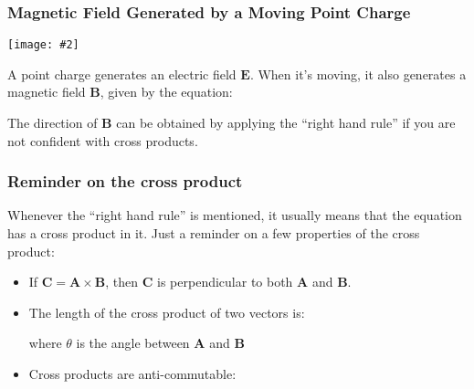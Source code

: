 \documentclass[12pt,aspectratio=169]{beamer}
\newcommand{\pic}[2]{\texttt{[image: \#2]}}
\newcommand{\mb}[1]{\mathbf{#1}}
\newcommand{\eq}[2]{\vspace{#1}{\Large\begin{displaymath}#2\end{displaymath}}}
\newcommand{\protip}[1]{
  \begin{center}
    \fbox{
      \begin{minipage}{.95\textwidth}
        {\footnotesize
          \textbf{Protip: }#1
        }
      \end{minipage}
    }
  \end{center}
}
\begin{document}
%
\begin{frame}
  \frametitle{Magnetic Field Generated by a Moving Point Charge}
  \begin{center}
    \pic{.35}{pointchargeB.png}
  \end{center}
  
  A point charge generates an electric field $\mb{E}$. When it's moving, it
  also generates a magnetic field $\mb{B}$, given by the equation:

  \eq{-.2in}{
    \boxed{\mb{B}=\frac{\mu_o}{4\pi}\frac{q\mb{v}\times\hat{\mb{r}}}{r^2}}
  }

  The direction of $\mb{B}$ can be obtained by applying the ``right hand rule''
  if you are not confident with cross products.
  

\end{frame}


\begin{frame}
  \frametitle{Reminder on the cross product}
  Whenever the ``right hand rule'' is mentioned, it usually means that the
  equation has a cross product in it. Just a reminder on a few properties of
  the cross product:
  \begin{itemize}
  \item If $\mb{C}=\mb{A}\times\mb{B}$, then $\mb{C}$ is perpendicular to both
    $\mb{A}$ and $\mb{B}$.
  \item The length of the cross product of two vectors is:
    
    \eq{-.3in}{
      |\mb{A}\times\mb{B}|=|\mb{A}||\mb{B}|\sin\theta
    }
    where $\theta$ is the angle between $\mb{A}$ and $\mb{B}$
  \item Cross products are anti-commutable:

    \eq{-.35in}{
      \mb{A}\times\mb{B}=-\mb{B}\times\mb{A}
    }
  \end{itemize}
\end{frame}
\end{document}
